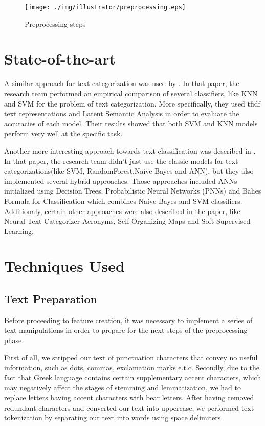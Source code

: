 \documentclass[10pt,journal,compsoc]{IEEEtran}
\begin{document}
\begin{figure}[!t]
	\centering
	\texttt{[image: ./img/illustrator/preprocessing.eps]}
	\caption{Preprocessing steps}
	\label{preprocessing}
\end{figure}

\section{State-of-the-art}
A similar approach for text categorization was used
by \cite{a3}.
In that paper, the research team performed
an empirical comparison of several classifiers, like KNN
and SVM for the problem of text categorization.
More specifically, they used tfidf text representations
and Latent Semantic Analysis in order to evaluate the accuracies
of each model.
Their results showed that both SVM and KNN models perform
very well at the specific task.

Another more interesting approach towards text classification
was described in \cite{a4}.
In that paper, the research team didn't just use the classic
models for text categorizations(like SVM, RandomForest,Naive
Bayes and ANN), but they also implemented several hybrid
approaches.
Those approaches included ANNs initialized using Decision
Trees, Probabilistic Neural Networks (PNNs) and Bahes
Formula for Classification which combines Naive Bayes
and SVM classifiers.
Additionaly, certain other approaches were also described
in the paper, like Neural Text Categorizer Acronyms,
Self Organizing Maps and Soft-Supervised Learning.

\section{Techniques Used}
\subsection{Text Preparation}
Before proceeding to feature creation, it was necessary to
implement a series of text manipulations in order to
prepare for the next steps of the preprocessing phase.

First of all, we stripped our text of punctuation characters 
that convey no useful information, such as dots, commas,
exclamation marks e.t.c.
Secondly, due to the fact that Greek language contains
certain supplementary accent characters, which may negatively
affect the stages of stemming and lemmatization, we had to
replace letters having accent characters with bear letters.
After having removed redundant characters and converted
our text into uppercase, we performed text tokenization
by separating our text into words using space delimiters.
\end{document}
